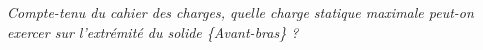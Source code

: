 \begin{multicols}{2}
\subparagraph{}
\textit{Compte-tenu du cahier des charges, quelle charge statique maximale peut-on exercer sur l’extrémité du solide \{Avant-bras\} ?}
\ifprof
\begin{corrige}
\end{corrige}
\else
\fi
%
%
%
%
%

\end{multicols}

